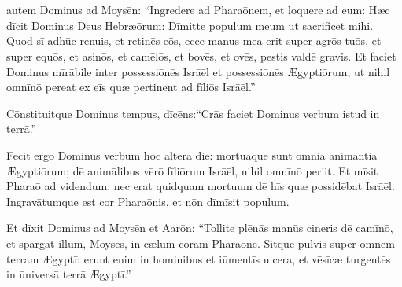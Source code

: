 \chapter{}


\thispagestyle{empty}

 autem Dominus ad Moysēn: ``Ingre\-dere ad Pharaōnem, et loquere ad eum: Hæc dīcit
Dominus Deus Hebræōrum: Dīmitte populum meum ut
sacrificet mihi.  Quod sī adhūc renuis, et retinēs
eōs,  ecce manus mea erit super agrōs tuōs, et super equōs, et asinōs, et
camēlōs, et bovēs, et ovēs, pestis valdē gravis.  Et faciet Dominus mīrābile
inter possessiōnēs Isrāēl et possessiōnēs
Ægyptiōrum, ut nihil omnīnō pereat ex eīs quæ
pertinent ad fīliōs Isrāēl.''

Cōnstituitque Dominus tempus, dīcēns:\linebreak``Crās faciet Dominus verbum istud in
terrā.'' 

Fēcit ergō Dominus verbum hoc
alterā diē: mortuaque sunt omnia animantia Ægyptiōrum; dē animālibus vērō
fīliōrum Isrāēl, nihil omnīnō periit.  Et mīsit Pharaō ad
videndum: nec erat quidquam mortuum dē hīs quæ possidēbat Isrāēl.
Ingravātumque est cor
Pharaōnis, et nōn dīmīsit populum.

Et dīxit Dominus ad
Moysēn et Aarōn: ``Tollite plēnās manūs cineris dē
camīnō, et spargat illum, Moysēs, in cælum
cōram Pharaōne.  Sitque pulvis super omnem terram Æ\-gyptī: erunt enim in hominibus et
iūmentīs ulcera, et vēsīcæ
turgentēs in ūniversā terrā Ægyptī.''

